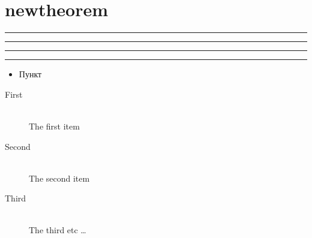 \documentclass{article}
\begin{document}
 \section{newtheorem}    
     
     


\newlength{\barlength}
\setlength{\barlength}{4 cm minus 1 cm}
 \noindent
  \textcolor{barcolor1}{\rule{\barlength}{1cm}}
 \rule{\barlength}{1pt}
 \vspace{\barlength}
  \textcolor{barcolor2}{\rule{\barlength}{1cm}}
  \textcolor{gray50}{\rule{\barlength}{1 cm}}
    
		
        
        
   \begin{itemize}
       \item Пункт 
     \end{itemize}   
        
    \begin{description}
        \item[First] \hfill \\
        The first item
        \item[Second] \hfill \\
        The second item
        \item[Third] \hrulefill \\
        The third etc \ldots
    \end{description}    
        
        
\end{document}
